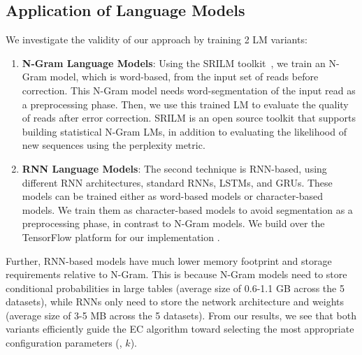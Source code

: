 \subsection{Application of Language Models}
We investigate the validity of our approach by training 2 LM variants: 
\begin{enumerate}
\item \textbf{N-Gram Language Models}: Using the SRILM toolkit~\cite{Stolcke02srilm--}, we train an N-Gram model, which is word-based, from the input set of reads before correction. This N-Gram model needs word-segmentation of the input read as a preprocessing phase. Then, we use this trained LM to evaluate the quality of reads after error correction. SRILM is an open source toolkit that supports building statistical N-Gram LMs, in addition to evaluating the likelihood of new sequences using the perplexity metric. 

\item \textbf{RNN Language Models}: The second technique is RNN-based, using different RNN architectures, \eg standard RNNs, LSTMs, and GRUs.
These models can be trained either as word-based models or character-based models. We train them as character-based models to avoid segmentation as a preprocessing phase, in contrast to N-Gram models. We build over the TensorFlow platform for our implementation \cite{45381}.
\end{enumerate}

Further, RNN-based models have much lower memory footprint and storage requirements relative to N-Gram. This is because N-Gram models need to store conditional probabilities in large tables (average size of 0.6-1.1 GB across the 5 datasets), while RNNs only need to store the network architecture and  weights (average size of 3-5 MB across the 5 datasets). 
From our results, we see that both \name variants efficiently guide the EC algorithm toward selecting the most appropriate configuration parameters (\eg, $k$). 

